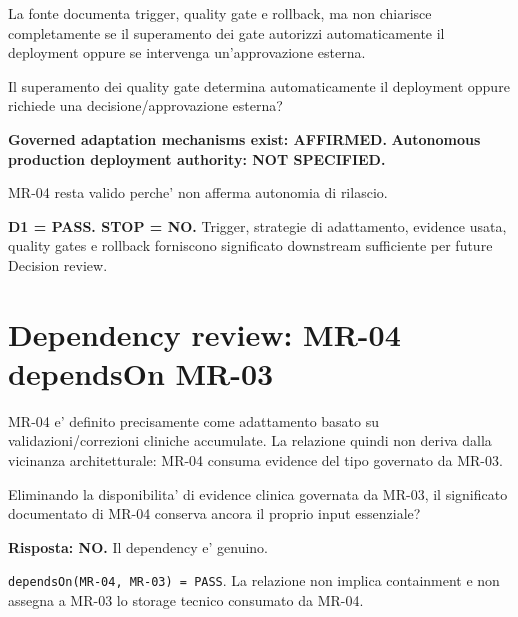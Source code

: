 \documentclass[11pt,a4paper]{article}
\begin{document}
La fonte documenta trigger, quality gate e rollback, ma non chiarisce completamente se il superamento dei gate autorizzi automaticamente il deployment oppure se intervenga un'approvazione esterna.

\begin{ddtacheck}[title={Smallest critical proposition}]
Il superamento dei quality gate determina automaticamente il deployment oppure richiede una decisione/approvazione esterna?
\end{ddtacheck}

\textbf{Governed adaptation mechanisms exist: AFFIRMED.}\quad
\textbf{Autonomous production deployment authority: NOT SPECIFIED.}

MR-04 resta valido perche' non afferma autonomia di rilascio.

\begin{ddtacore}[title={MR-04 disposition}]
\textbf{D1 = PASS. STOP = NO.} Trigger, strategie di adattamento, evidence usata, quality gates e rollback forniscono significato downstream sufficiente per future Decision review.
\end{ddtacore}

\section{Dependency review: MR-04 dependsOn MR-03}

MR-04 e' definito precisamente come adattamento basato su validazioni/correzioni cliniche accumulate. La relazione quindi non deriva dalla vicinanza architetturale: MR-04 consuma evidence del tipo governato da MR-03.

\begin{ddtacheck}[title={Dependency question}]
Eliminando la disponibilita' di evidence clinica governata da MR-03, il significato documentato di MR-04 conserva ancora il proprio input essenziale?
\end{ddtacheck}

\textbf{Risposta: NO.} Il dependency e' genuino.

\begin{ddtacore}[title={Dependency disposition}]
\texttt{dependsOn(MR-04, MR-03) = PASS}. La relazione non implica containment e non assegna a MR-03 lo storage tecnico consumato da MR-04.
\end{ddtacore}

\end{document}
